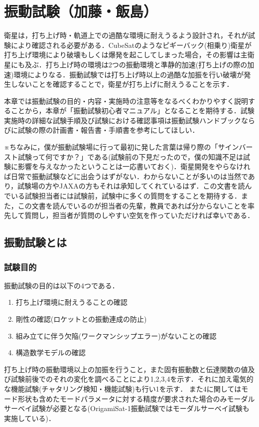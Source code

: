 \section{振動試験（加藤・飯島）}
衛星は，打ち上げ時・軌道上での過酷な環境に耐えうるよう設計され，それが試験により確認される必要がある．CubeSatのようなピギーバック(相乗り)衛星が打ち上げ環境により破壊もしくは爆発を起こしてしまった場合，その影響は主衛星にも及ぶ．打ち上げ時の環境は2つの振動環境と準静的加速(打ち上げの際の加速)環境によりなる．振動試験では打ち上げ時以上の過酷な加振を行い破壊が発生しないことを確認することで，衛星が打ち上げに耐えうることを示す．\par
本章では振動試験の目的・内容・実施時の注意等をなるべくわかりやすく説明することから，本章が「振動試験初心者マニュアル」となることを期待する．試験実施時の詳細な試験手順及び試験における確認事項は振動試験ハンドブック\cite{vibration_test_handbook}ならびに試験の際の計画書・報告書・手順書\cite{EM_vibration_test_manual}\cite{EM_vibration_test_report}\cite{EM_vibration_test_plan}\cite{FM_vibration_test_manual}\cite{FM_vibration_test_report}\cite{FM_vibration_test_plan}\cite{re_FM_vibration_test_manual}\cite{re_FM_vibration_test_report}\cite{re_FM_vibration_test_plan}を参考にしてほしい．\par
\vspace{\baselineskip}
※ちなみに，僕が振動試験場に行って最初に発した言葉は帰り際の「サインバースト試験って何ですか？」である(試験前の下見だったので，僕の知識不足は試験に影響を与えなかったということは一応書いておく)．衛星開発をやらなければ日常で振動試験などに出会うはずがない．わからないことが多いのは当然であり，試験場の方やJAXAの方もそれは承知してくれているはず．この文書を読んでいる試験担当者には試験前，試験中に多くの質問をすることを期待する．また，この文書を読んでいるのが担当者の先輩，教員であれば分からないことを率先して質問し，担当者が質問のしやすい空気を作っていただければ幸いである．

\subsection{振動試験とは}
\subsubsection{試験目的}
振動試験の目的は以下の4つである．
\begin{enumerate}
	\item 打ち上げ環境に耐えうることの確認
	\item 剛性の確認(ロケットとの振動連成の防止)
	\item 組み立てに伴う欠陥(ワークマンシップエラー)がないことの確認
	\item 構造数学モデルの確認
\end{enumerate}
打ち上げ時の振動環境以上の加振を行うこと，また固有振動数と伝達関数の値及び試験前後でのそれの変化を調べることにより1,2,3,4を示す．それに加え電気的な機能試験(チャタリング検知・機能試験)も行い1を示す．
また4に関してはモード形状も含めたモードパラメータに対する精度が要求された場合のみモーダルサーベイ試験が必要となる(OrigamiSat-1振動試験ではモーダルサーベイ試験も実施している)．

